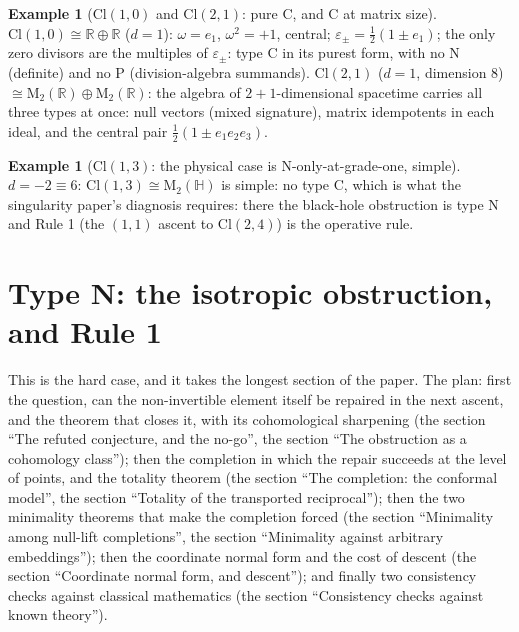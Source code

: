 \documentclass[11pt]{article}
\theoremstyle{definition}
\newtheorem{example}[theorem]{Example}
\theoremstyle{plain}
\providecommand{\Cl}{}\renewcommand{\Cl}{\mathrm{Cl}}
\providecommand{\HH}{}\renewcommand{\HH}{\mathbb{H}}
\providecommand{\Mat}{}\renewcommand{\Mat}{\mathrm{M}}
\providecommand{\R}{}\renewcommand{\R}{\mathbb{R}}
\begin{document}
\begin{example}[$\Cl(1,0)$ and $\Cl(2,1)$: pure C, and C at matrix size]\label{c:note.transport.cl-1-0-cl-2-1}
$\Cl(1,0) \cong \R \oplus \R$ ($d = 1$): $\omega = e_1$, $\omega^2 = +1$, central; $\varepsilon_\pm = \tfrac12(1 \pm e_1)$; the only zero divisors are the multiples of $\varepsilon_\pm$: type C in its purest form, with no N (definite) and no P (division-algebra summands). $\Cl(2,1)$ ($d = 1$, dimension 8) $\cong \Mat_2(\R) \oplus \Mat_2(\R)$: the algebra of $2{+}1$-dimensional spacetime carries all three types at once: null vectors (mixed signature), matrix idempotents in each ideal, and the central pair $\tfrac12(1 \pm e_1e_2e_3)$.
\end{example}

\begin{example}[$\Cl(1,3)$: the physical case is N-only-at-grade-one, simple]\label{c:note.transport.cl-1-3-physical-case-n}
$d = -2 \equiv 6$: $\Cl(1,3) \cong \Mat_2(\HH)$ is simple: no type C, which is what the singularity paper's diagnosis requires: there the black-hole obstruction is type N and Rule 1 (the $(1,1)$ ascent to $\Cl(2,4)$) is the operative rule.
\end{example}

\section{Type N: the isotropic obstruction, and Rule 1}

\label{c:note.transport.setting-type-n-isotropic-obstruction-rule}
This is the hard case, and it takes the longest section of the paper. The plan: first the question, can the non-invertible element itself be repaired in the next ascent, and the theorem that closes it, with its cohomological sharpening (the section ``The refuted conjecture, and the no-go'', the section ``The obstruction as a cohomology class''); then the completion in which the repair succeeds at the level of points, and the totality theorem (the section ``The completion: the conformal model'', the section ``Totality of the transported reciprocal''); then the two minimality theorems that make the completion forced (the section ``Minimality among null-lift completions'', the section ``Minimality against arbitrary embeddings''); then the coordinate normal form and the cost of descent (the section ``Coordinate normal form, and descent''); and finally two consistency checks against classical mathematics (the section ``Consistency checks against known theory'').
\end{document}

